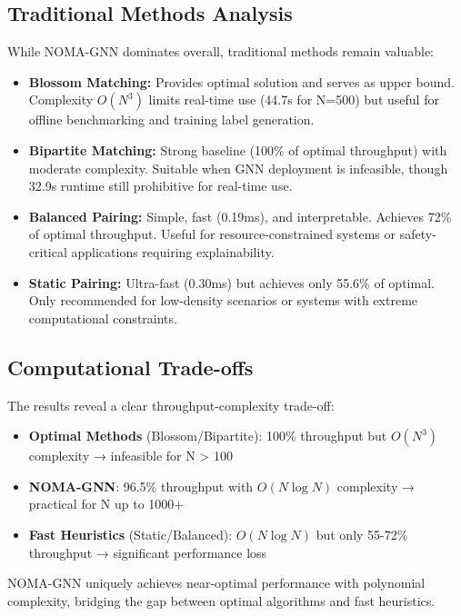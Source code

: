 \subsection{Traditional Methods Analysis}

While NOMA-GNN dominates overall, traditional methods remain valuable:

\begin{itemize}
    \item \textbf{Blossom Matching:} Provides optimal solution and serves as upper bound. Complexity $O(N^3)$ limits real-time use (44.7s for N=500) but useful for offline benchmarking and training label generation.
    
    \item \textbf{Bipartite Matching:} Strong baseline (100\% of optimal throughput) with moderate complexity. Suitable when GNN deployment is infeasible, though 32.9s runtime still prohibitive for real-time use.
    
    \item \textbf{Balanced Pairing:} Simple, fast (0.19ms), and interpretable. Achieves 72\% of optimal throughput. Useful for resource-constrained systems or safety-critical applications requiring explainability.
    
    \item \textbf{Static Pairing:} Ultra-fast (0.30ms) but achieves only 55.6\% of optimal. Only recommended for low-density scenarios or systems with extreme computational constraints.
\end{itemize}

\subsection{Computational Trade-offs}

The results reveal a clear throughput-complexity trade-off:

\begin{itemize}
    \item \textbf{Optimal Methods} (Blossom/Bipartite): 100\% throughput but $O(N^3)$ complexity → infeasible for N > 100
    \item \textbf{NOMA-GNN}: 96.5\% throughput with $O(N \log N)$ complexity → practical for N up to 1000+
    \item \textbf{Fast Heuristics} (Static/Balanced): $O(N \log N)$ but only 55-72\% throughput → significant performance loss
\end{itemize}

NOMA-GNN uniquely achieves near-optimal performance with polynomial complexity, bridging the gap between optimal algorithms and fast heuristics.

